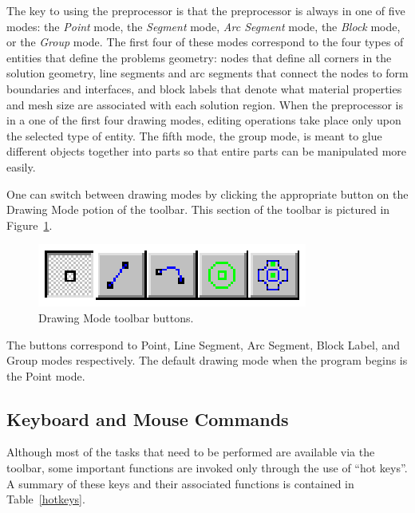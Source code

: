 \documentclass[12pt]{report}
\begin{document}
The key to using the preprocessor is that the preprocessor is
always in one of five modes: the {\em Point} mode, the {\em
Segment} mode, {\em Arc Segment} mode, the {\em Block} mode, or the
{\em Group} mode. The first four of these modes correspond to the
four types of entities that define the problems geometry: nodes
that define all corners in the solution geometry, line segments and
arc segments that connect the nodes to form boundaries and
interfaces, and block labels that denote what material properties
and mesh size are associated with each solution region. When the
preprocessor is in a one of the first four drawing modes, editing
operations take place only upon the selected type of entity.  The
fifth mode, the group mode, is meant to glue different objects
together into parts so that entire parts can be manipulated more
easily.

One can switch between drawing modes by clicking the appropriate
button on the Drawing Mode potion of the toolbar. This section of
the toolbar is pictured in Figure~\ref{modebuttons}.
\begin{figure}[ht]
\centerline{\includegraphics{modebtn.ps}}
\caption{Drawing Mode toolbar buttons.}
\label{modebuttons}
\end{figure}
The buttons correspond to Point, Line Segment, Arc Segment, Block
Label, and Group modes respectively.  The default drawing mode when
the program begins is the Point mode.

\subsection{Keyboard and Mouse Commands}
Although most of the tasks that need to be performed are available
via the toolbar, some important functions are invoked only through
the use of ``hot keys''. A summary of these keys and their
associated functions is contained in Table~\ref{hotkeys}.
\end{document}
